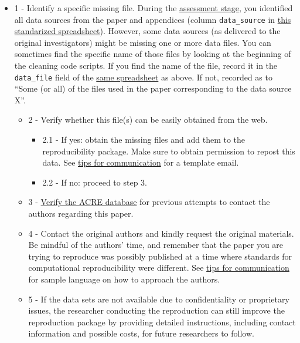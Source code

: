 \documentclass[]{book}
\providecommand{\tightlist}{%
  \setlength{\itemsep}{0pt}\setlength{\parskip}{0pt}}
\begin{document}
\begin{itemize}
\tightlist
\item
  1 - Identify a specific missing file. During the \protect\hyperlink{assessment}{assessment stage}, you identified all data sources from the paper and appendices (column \texttt{data\_source} in \href{https://docs.google.com/spreadsheets/d/1LUIdVFH0OfR70C7z07TYeE-uWzKI_JIeWUMaYhqEKK0/edit\#gid=0\&range=A1}{this standarized spreadsheet}). However, some data sources (as delivered to the original investigators) might be missing one or more data files. You can sometimes find the specific name of those files by looking at the beginning of the cleaning code scripts. If you find the name of the file, record it in the \texttt{data\_file} field of the \href{https://docs.google.com/spreadsheets/d/1LUIdVFH0OfR70C7z07TYeE-uWzKI_JIeWUMaYhqEKK0/edit\#gid=0\&range=A1}{same spreadsheet} as above. If not, recorded as to ``Some (or all) of the files used in the paper corresponding to the data source X''.

  \begin{itemize}
  \tightlist
  \item
    2 - Verify whether this file(s) can be easily obtained from the web.

    \begin{itemize}
    \tightlist
    \item
      2.1 - If yes: obtain the missing files and add them to the reproducibility package. Make sure to obtain permission to repost this data. See \protect\hyperlink{tips-for-communication}{tips for communication} for a template email.\\
    \item
      2.2 - If no: proceed to step 3.\\
    \end{itemize}
  \item
    3 - \href{ADD\%20LINK}{Verify the ACRE database} for previous attempts to contact the authors regarding this paper.\\
  \item
    4 - Contact the original authors and kindly request the original materials. Be mindful of the authors' time, and remember that the paper you are trying to reproduce was possibly published at a time where standards for computational reproducibility were different. See \protect\hyperlink{tips-for-communication}{tips for communication} for sample language on how to approach the authors.\\
  \item
    5 - If the data sets are not available due to confidentiality or proprietary issues, the researcher conducting the reproduction can still improve the reproduction package by providing detailed instructions, including contact information and possible costs, for future researchers to follow.
  \end{itemize}
\end{itemize}
\end{document}
